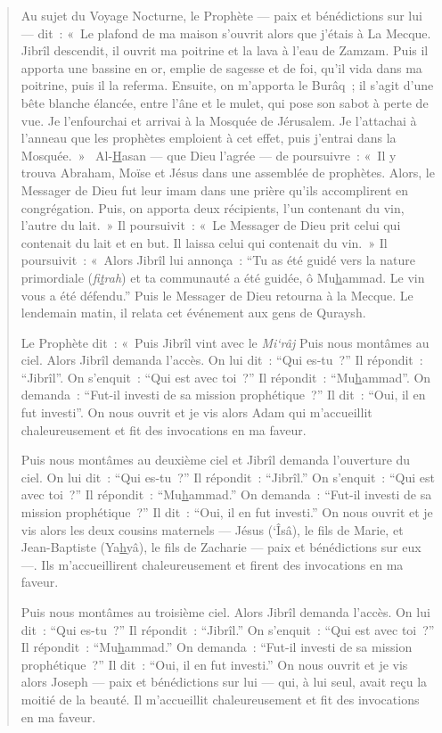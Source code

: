 \begin{quote}
Au sujet du Voyage Nocturne, le Prophète --- paix et bénédictions sur
lui --- dit~: «~Le plafond de ma maison s'ouvrit alors que j'étais à La
Mecque. Jibrîl descendit, il ouvrit ma poitrine et la lava à l'eau de
Zamzam. Puis il apporta une bassine en or, emplie de sagesse et de foi,
qu'il vida dans ma poitrine, puis il la referma. Ensuite, on m'apporta
le Burâq~; il s'agit d'une bête blanche élancée, entre l'âne et le
mulet, qui pose son sabot à perte de vue. Je l'enfourchai et arrivai à
la Mosquée de Jérusalem. Je l'attachai à l'anneau que les prophètes
emploient à cet effet, puis j'entrai dans la Mosquée.~»~
Al-\underline{H}asan --- que Dieu l'agrée --- de poursuivre~: «~Il y
trouva Abraham, Moïse et Jésus dans une assemblée de prophètes. Alors,
le Messager de Dieu fut leur imam dans une prière qu'ils accomplirent en
congrégation. Puis, on apporta deux récipients, l'un contenant du vin,
l'autre du lait.~» Il poursuivit~: «~Le Messager de Dieu prit celui qui
contenait du lait et en but. Il laissa celui qui contenait du vin.~» Il
poursuivit~: «~Alors Jibrîl lui annonça~: ``Tu as été guidé vers la
nature primordiale (\emph{fi\underline{t}rah}) et ta communauté a été
guidée, ô Mu\underline{h}ammad. Le vin vous a été défendu.'' Puis le
Messager de Dieu retourna à la Mecque. Le lendemain matin, il relata cet
événement aux gens de Quraysh.

Le Prophète dit~: «~Puis Jibrîl vint avec le \emph{Mi`râj} Puis nous
montâmes au ciel. Alors Jibrîl demanda l'accès. On lui dit~: ``Qui
es-tu~?'' Il répondit~: ``Jibrîl''. On s'enquit~: ``Qui est avec toi~?''
Il répondit~: ``Mu\underline{h}ammad''. On demanda~: ``Fut-il investi de
sa mission prophétique~?'' Il dit~: ``Oui, il en fut investi''. On nous
ouvrit et je vis alors Adam qui m'accueillit chaleureusement et fit des
invocations en ma faveur.

Puis nous montâmes au deuxième ciel et Jibrîl demanda l'ouverture du
ciel. On lui dit~: ``Qui es-tu~?'' Il répondit~: ``Jibrîl.'' On
s'enquit~: ``Qui est avec toi~?'' Il répondit~:
``Mu\underline{h}ammad.'' On demanda~: ``Fut-il investi de sa mission
prophétique~?'' Il dit~: ``Oui, il en fut investi.'' On nous ouvrit et
je vis alors les deux cousins maternels --- Jésus (`Îsâ), le fils de
Marie, et Jean-Baptiste (Ya\underline{h}yâ), le fils de Zacharie ---
paix et bénédictions sur eux ---. Ils m'accueillirent chaleureusement et
firent des invocations en ma faveur.

Puis nous montâmes au troisième ciel. Alors Jibrîl demanda l'accès. On
lui dit~: ``Qui es-tu~?'' Il répondit~: ``Jibrîl.'' On s'enquit~: ``Qui
est avec toi~?'' Il répondit~: ``Mu\underline{h}ammad.'' On demanda~:
``Fut-il investi de sa mission prophétique~?'' Il dit~: ``Oui, il en fut
investi.'' On nous ouvrit et je vis alors Joseph --- paix et
bénédictions sur lui --- qui, à lui seul, avait reçu la moitié de la
beauté. Il m'accueillit chaleureusement et fit des invocations en ma
faveur.


\end{quote}

